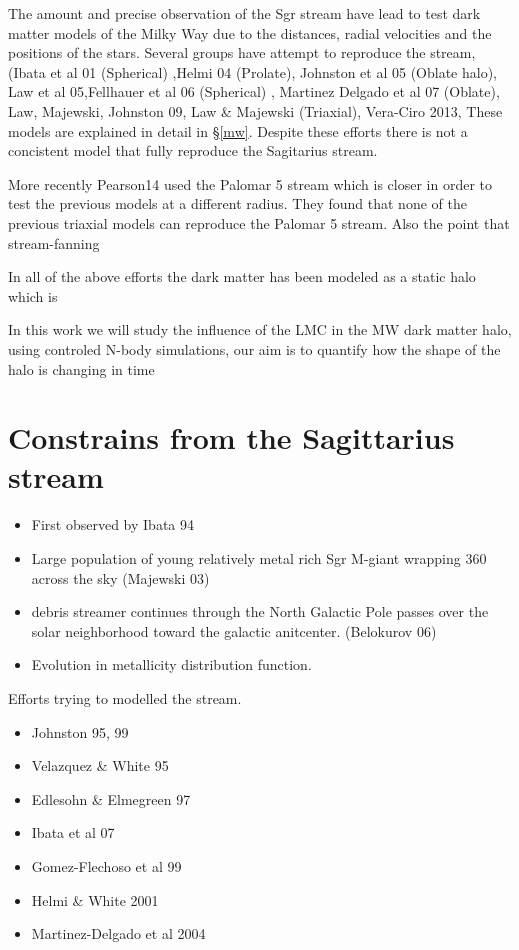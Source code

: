 \documentclass[12pt]{article}
\begin{document}
The amount and precise observation of the Sgr stream have lead to test dark matter models of
the Milky Way due to the distances, radial velocities and the positions of
the stars. Several groups have attempt to reproduce the stream, (Ibata et al 01 (Spherical)
,Helmi 04 (Prolate), Johnston et al 05 (Oblate halo), Law et al 05,Fellhauer et al 06 (Spherical)
, Martinez Delgado et al 07 (Oblate), Law, Majewski, Johnston 09, Law \& Majewski (Triaxial),
Vera-Ciro 2013, These models are explained in detail in \S \ref{mw}. Despite these efforts
there is not a concistent model that fully reproduce the Sagitarius stream.

More recently Pearson14 used the Palomar 5 stream which is closer in order to test
the previous models at a different radius. They found that none of the previous
triaxial models can reproduce the Palomar 5 stream. Also the point that stream-fanning 

In all of the above efforts the dark matter has been modeled as a static halo which is 

In this work we will study the influence of the LMC in the MW dark matter halo, 
using controled N-body simulations, our aim is to quantify how the shape of the halo 
is changing in time 

\section{Constrains from the Sagittarius stream}

\begin{itemize}
\item First observed by Ibata 94
\item Large population of young relatively metal rich Sgr M-giant wrapping 360
across the sky  (Majewski 03)
\item debris streamer continues through the North Galactic Pole passes over the 
solar neighborhood toward the galactic anitcenter. (Belokurov 06)
\item Evolution in metallicity distribution function.
\end{itemize}

Efforts trying to modelled the stream. 

\begin{itemize}
\item Johnston 95, 99
\item Velazquez \& White 95
\item Edlesohn \& Elmegreen 97
\item Ibata et al 07
\item Gomez-Flechoso et al 99
\item Helmi \& White 2001
\item Martinez-Delgado et al 2004
\end{itemize}
\end{document}
